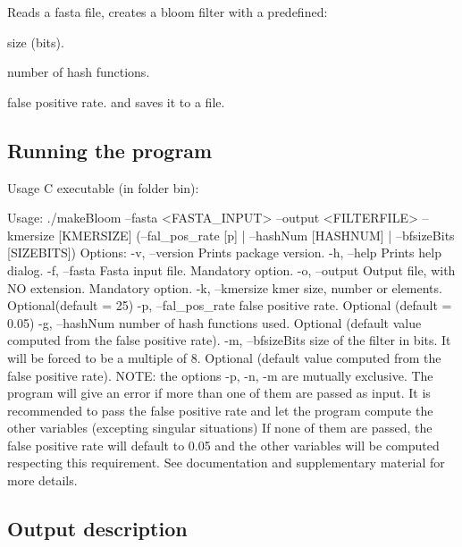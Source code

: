 Reads a {\ttfamily fasta} file, creates a bloom filter with a predefined\+:
\begin{DoxyItemize}
\item size (bits).
\item number of hash functions.
\item false positive rate. and saves it to a file.
\end{DoxyItemize}

\subsection*{Running the program}

Usage {\ttfamily C} executable (in folder {\ttfamily bin})\+:


\begin{DoxyCode}
Usage: ./makeBloom --fasta <FASTA\_INPUT> --output <FILTERFILE> --kmersize [KMERSIZE] 
 (--fal\_pos\_rate [p] | --hashNum [HASHNUM] | --bfsizeBits [SIZEBITS])
Options: 
 -v, --version      Prints package version.
 -h, --help         Prints help dialog.
 -f, --fasta        Fasta input file. Mandatory option.
 -o, --output       Output file, with NO extension. Mandatory option.
 -k, --kmersize     kmer size, number or elements. Optional(default = 25)
 -p, --fal\_pos\_rate false positive rate. Optional (default = 0.05)
 -g, --hashNum      number of hash functions used. Optional (default
                    value computed from the false positive rate).
 -m, --bfsizeBits   size of the filter in bits. It will be forced to be
                    a multiple of 8. Optional (default value computed
                    from the false positive rate).
NOTE: the options -p, -n, -m are mutually exclusive. The program 
      will give an error if more than one of them are passed as input.
      It is recommended to pass the false positive rate and let the 
      program compute the other variables (excepting singular situations)
      If none of them are passed, the false positive rate will default
      to 0.05 and the other variables will be computed respecting this
      requirement. See documentation and supplementary material for 
      more details.
\end{DoxyCode}


\subsection*{Output description}

